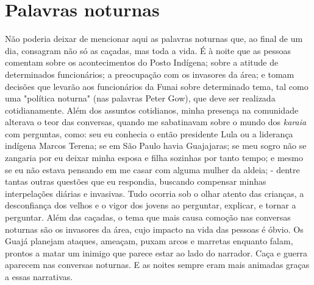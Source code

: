 \section{Palavras noturnas }\label{palavras-noturnas}

Não poderia deixar de mencionar aqui as palavras noturnas que, ao final
de um dia, consagram não só as caçadas, mas toda a vida. É à noite que
as pessoas comentam sobre os acontecimentos do Posto Indígena; sobre a
atitude de determinados funcionários; a preocupação com os invasores da
área; e tomam decisões que levarão aos funcionários da Funai sobre
determinado tema, tal como uma "política noturna" (nas palavras Peter
Gow), que deve ser realizada cotidianamente. Além dos assuntos
cotidianos, minha presença na comunidade alterava o teor das conversas,
quando me sabatinavam sobre o mundo dos \emph{karaia} com perguntas,
como: seu eu conhecia o então presidente Lula ou a liderança indígena
Marcos Terena; se em São Paulo havia Guajajaras; se meu sogro não se
zangaria por eu deixar minha esposa e filha sozinhas por tanto tempo; e
mesmo se eu não estava pensando em me casar com alguma mulher da aldeia;
- dentre tantas outras questões que eu respondia, buscando compensar
minhas interpelações diárias e invasivas. Tudo ocorria sob o olhar
atento das crianças, a desconfiança dos velhos e o vigor dos jovens ao
perguntar, explicar, e tornar a perguntar. Além das caçadas, o tema que
mais causa comoção nas conversas noturnas são os invasores da área, cujo
impacto na vida das pessoas é óbvio. Os Guajá planejam ataques, ameaçam,
puxam arcos e marretas enquanto falam, prontos a matar um inimigo que
parece estar ao lado do narrador. Caça e guerra aparecem nas conversas
noturnas. E as noites sempre eram mais animadas graças a essas
narrativas.

